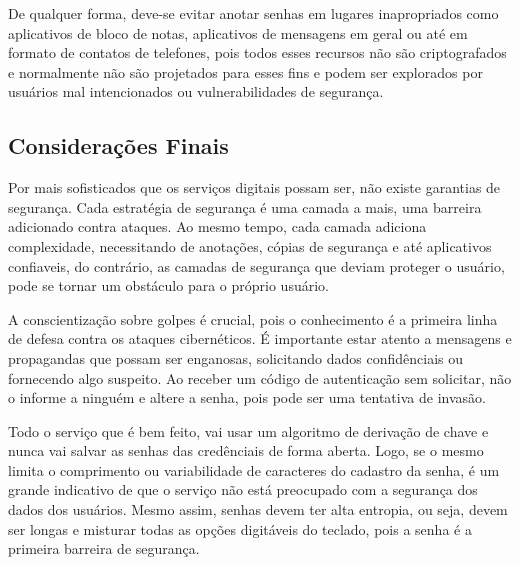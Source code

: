 \documentclass[12pt]{article}
\begin{document}
De qualquer forma, deve-se evitar anotar senhas em lugares inapropriados como aplicativos de
bloco de notas, aplicativos de mensagens em geral ou até em formato de contatos de telefones,
pois todos esses recursos não são criptografados e normalmente não são projetados para esses
fins e podem ser explorados por usuários mal intencionados ou vulnerabilidades de segurança.

\subsection{Considerações Finais}

Por mais sofisticados que os serviços digitais possam ser, não existe garantias de segurança.
Cada estratégia de segurança é uma camada a mais, uma barreira adicionado contra ataques.
Ao mesmo tempo, cada camada adiciona complexidade, necessitando de anotações, cópias de
segurança e até aplicativos confiaveis, do contrário, as camadas de segurança que deviam
proteger o usuário, pode se tornar um obstáculo para o próprio usuário.

A conscientização sobre golpes é crucial, pois o conhecimento é a primeira linha de defesa contra
os ataques cibernéticos.
É importante estar atento a mensagens e propagandas que possam ser enganosas, solicitando dados
confidênciais ou fornecendo algo suspeito.
Ao receber um código de autenticação sem solicitar, não o informe a ninguém e altere a senha,
pois pode ser uma tentativa de invasão.

Todo o serviço que é bem feito, vai usar um algoritmo de derivação de chave e nunca vai salvar
as senhas das credênciais de forma aberta.
Logo, se o mesmo limita o comprimento ou variabilidade de caracteres do cadastro da senha, é um
grande indicativo de que o serviço não está preocupado com a segurança dos dados dos usuários.
Mesmo assim, senhas devem ter alta entropia, ou seja, devem ser longas e misturar todas as opções
digitáveis do teclado, pois a senha é a primeira barreira de segurança.



\end{document}
